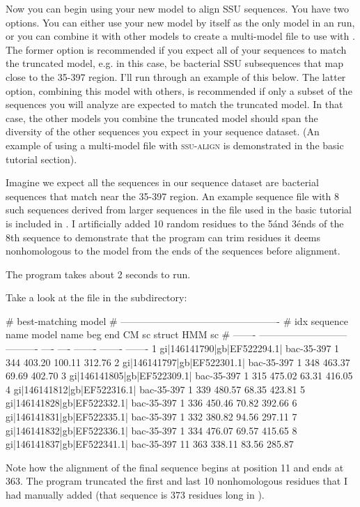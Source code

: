 Now you can begin using your new model  to align
SSU sequences. You have two options.  You can either use your new
model by itself as the only model in an  run, or you
can combine it with other models to create a multi-model file to use
with . The former option is recommended if you expect
all of your sequences to match the truncated model, e.g. in this case,
be bacterial SSU subsequences that map close to the 35-397
region. I'll run through an example of this below. The latter option,
combining this model with others, is recommended if only a subset of
the sequences you will analyze are expected to match the truncated
model. In that case, the other models you combine the truncated model
should span the diversity of the other sequences you expect in your
sequence dataset. (An example of using a multi-model file with
\textsc{ssu-align} is demonstrated in the basic tutorial section).

Imagine we expect all the sequences in our sequence dataset are
bacterial sequences that match near the 35-397 region. An example
sequence file with 8 such sequences derived from larger sequences in
the  file used in the basic tutorial is included in
. I artificially added 10 random residues to the 5\' and 3\'
ends of the 8th sequence to demonstrate that the program can 
trim residues it deems nonhomologous to the model from the ends of
the sequences before alignment.


The program takes about 2 seconds to run. 

Take a look at the  file in the 
subdirectory:

\begin{sreoutput}
#                                                      best-matching model                 
#                                       -------------------------------------------------  
#     idx  sequence name                model name   beg   end    CM sc   struct   HMM sc
# -------  ---------------------------  ----------  ----  ----  -------  -------  -------
        1  gi|146141790|gb|EF522294.1|  bac-35-397     1   344   403.20   100.11   312.76
        2  gi|146141797|gb|EF522301.1|  bac-35-397     1   348   463.37    69.69   402.70
        3  gi|146141805|gb|EF522309.1|  bac-35-397     1   315   475.02    63.31   416.05
        4  gi|146141812|gb|EF522316.1|  bac-35-397     1   339   480.57    68.35   423.81
        5  gi|146141828|gb|EF522332.1|  bac-35-397     1   336   450.46    70.82   392.66
        6  gi|146141831|gb|EF522335.1|  bac-35-397     1   332   380.82    94.56   297.11
        7  gi|146141832|gb|EF522336.1|  bac-35-397     1   334   476.07    69.57   415.65
        8  gi|146141837|gb|EF522341.1|  bac-35-397    11   363   338.11    83.56   285.87
\end{sreoutput}

Note how the alignment of the final sequence begins at position 11 and
ends at 363. The program truncated the first and last 10 nonhomologous
residues that I had manually added (that sequence is 373 residues long
in ).
